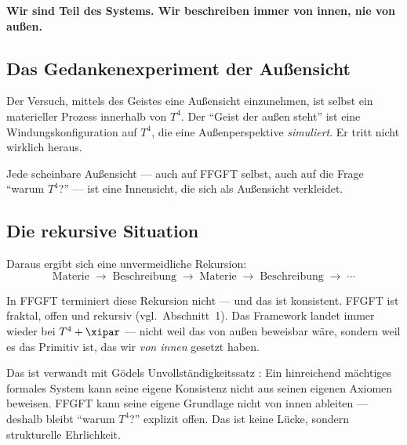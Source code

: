 \begin{erkenntnis}
\textbf{Wir sind Teil des Systems. Wir beschreiben immer von innen, nie von außen.}
\end{erkenntnis}

\subsection{Das Gedankenexperiment der Außensicht}

Der Versuch, mittels des Geistes eine Außensicht einzunehmen, ist selbst ein materieller Prozess innerhalb von $T^4$. Der ``Geist der außen steht'' ist eine Windungskonfiguration auf $T^4$, die eine Außenperspektive \emph{simuliert}. Er tritt nicht wirklich heraus.

Jede scheinbare Außensicht --- auch auf FFGFT selbst, auch auf die Frage ``warum $T^4$?'' --- ist eine Innensicht, die sich als Außensicht verkleidet.

\subsection{Die rekursive Situation}

Daraus ergibt sich eine unvermeidliche Rekursion:
\begin{equation}
  \text{Materie} \;\rightarrow\; \text{Beschreibung} \;\rightarrow\; \text{Materie} \;\rightarrow\; \text{Beschreibung} \;\rightarrow\; \cdots
\end{equation}

In FFGFT terminiert diese Rekursion nicht --- und das ist konsistent. FFGFT ist fraktal, offen und rekursiv (vgl.\ Abschnitt~1). Das Framework landet immer wieder bei $T^4 + \xipar$ --- nicht weil das von außen beweisbar wäre, sondern weil es das Primitiv ist, das wir \emph{von innen} gesetzt haben.

\begin{keyresult}
Das ist verwandt mit Gödels Unvollständigkeitssatz \cite{Goedel1931}: Ein hinreichend mächtiges formales System kann seine eigene Konsistenz nicht aus seinen eigenen Axiomen beweisen. FFGFT kann seine eigene Grundlage nicht von innen ableiten --- deshalb bleibt ``warum $T^4$?'' explizit offen. Das ist keine Lücke, sondern strukturelle Ehrlichkeit.
\end{keyresult}

